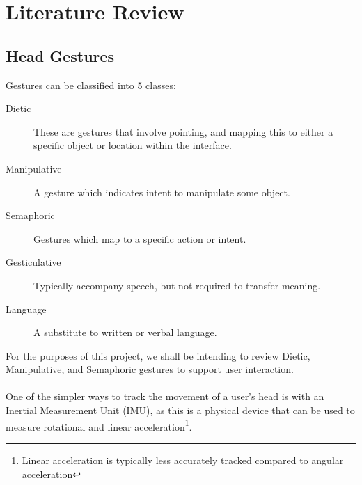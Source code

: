 \section{Literature Review} %


%   


\subsection{Head Gestures}

Gestures can be classified into 5 classes\cite{karam2005taxonomy}:
\begin{description}
    \item[Dietic] These are gestures that involve pointing, and mapping this to either a specific object or location within the interface.
    \item[Manipulative] A gesture which indicates intent to manipulate some object.
    \item[Semaphoric] Gestures which map to a specific action or intent.
    \item[Gesticulative] Typically accompany speech, but not required to transfer meaning.
    \item[Language] A substitute to written or verbal language.
\end{description}
For the purposes of this project, we shall be intending to review Dietic, Manipulative, and Semaphoric gestures to support user interaction.
\\\\
One of the simpler ways to track the movement of a user's head is with an Inertial Measurement Unit
 (IMU), as this is a physical device that can be used to measure rotational and linear acceleration\footnote{Linear acceleration is typically less accurately tracked compared to angular acceleration}.

